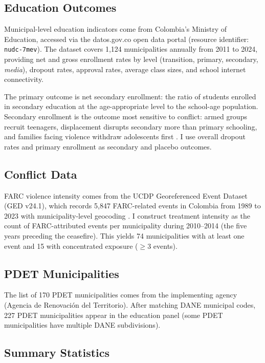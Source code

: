 \documentclass[12pt]{article}
\begin{document}
\subsection{Education Outcomes}

Municipal-level education indicators come from Colombia's Ministry of Education, accessed via the datos.gov.co open data portal (resource identifier: \texttt{nudc-7mev}). The dataset covers 1,124 municipalities annually from 2011 to 2024, providing net and gross enrollment rates by level (transition, primary, secondary, \emph{media}), dropout rates, approval rates, average class sizes, and school internet connectivity.

The primary outcome is net secondary enrollment: the ratio of students enrolled in secondary education at the age-appropriate level to the school-age population. Secondary enrollment is the outcome most sensitive to conflict: armed groups recruit teenagers, displacement disrupts secondary more than primary schooling, and families facing violence withdraw adolescents first \citep{rodriguez2010colombian, singh2018economic}. I use overall dropout rates and primary enrollment as secondary and placebo outcomes.

\subsection{Conflict Data}

FARC violence intensity comes from the UCDP Georeferenced Event Dataset (GED v24.1), which records 5,847 FARC-related events in Colombia from 1989 to 2023 with municipality-level geocoding \citep{sundberg2013introducing}. I construct treatment intensity as the count of FARC-attributed events per municipality during 2010--2014 (the five years preceding the ceasefire). This yields 74 municipalities with at least one event and 15 with concentrated exposure ($\geq$3 events).

\subsection{PDET Municipalities}

The list of 170 PDET municipalities comes from the implementing agency (Agencia de Renovaci\'on del Territorio). After matching DANE municipal codes, 227 PDET municipalities appear in the education panel (some PDET municipalities have multiple DANE subdivisions).

\subsection{Summary Statistics}
\end{document}
